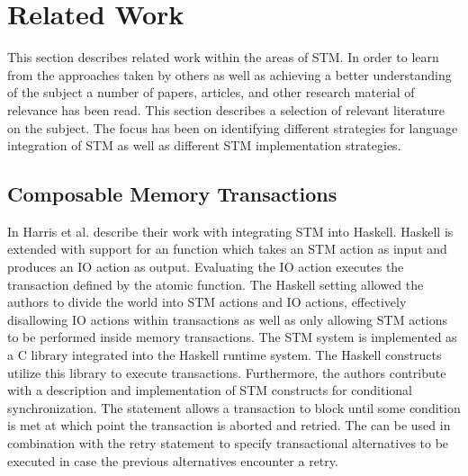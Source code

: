 \section{Related Work}
\label{sec:intro_related_work}
This section describes related work within the areas of \ac{STM}. In order to learn from the approaches taken by others as well as achieving a better understanding of the subject a number of papers, articles, and other research material of relevance has been read. This section describes a selection of relevant literature on the subject. The focus has been on identifying different strategies for language integration of \ac{STM} as well as different \ac{STM} implementation strategies.

\subsection{Composable Memory Transactions}
In \cite{harris2005composable} Harris et al. describe their work with integrating \ac{STM} into Haskell. Haskell is extended with support for an  function which takes an \ac{STM} action as input and produces an \ac{IO} action as output\cite[p. 51]{harris2005composable}. Evaluating the IO action executes the transaction defined by the atomic function. The Haskell setting allowed the authors to divide the world into \ac{STM} actions and \ac{IO} actions\cite[p. 51]{harris2005composable}, effectively disallowing \ac{IO} actions within transactions as well as only allowing \ac{STM} actions to be performed inside memory transactions. The \ac{STM} system is implemented as a C library integrated into the Haskell runtime system. The Haskell constructs utilize this library to execute transactions\cite[p. 56]{harris2005composable}. Furthermore, the authors contribute with a description and implementation of \ac{STM} constructs for conditional synchronization. The  statement allows a transaction to block until some condition is met at which point the transaction is aborted and retried\cite[p. 52]{harris2005composable}. The  can be used in combination with the retry statement to specify transactional alternatives to be executed in case the previous alternatives encounter a retry\cite[p. 52]{harris2005composable}.

